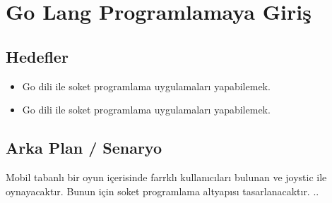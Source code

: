\section{Go Lang Programlamaya Giriş}
\subsection{Hedefler}
\begin{itemize}
    \item Go dili ile soket programlama uygulamaları yapabilemek.
    \item Go dili ile soket programlama uygulamaları yapabilemek.
\end{itemize}


\subsection{Arka Plan / Senaryo}
Mobil tabanlı bir oyun içerisinde farrklı kullanıcıları bulunan ve joystic ile oynayacaktır. Bunun için soket programlama altyapısı tasarlanacaktır. ..

